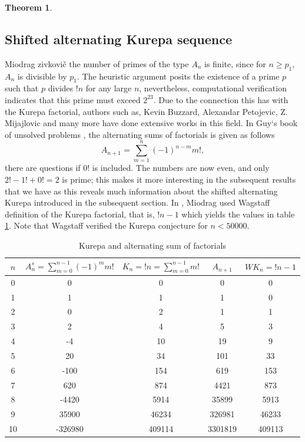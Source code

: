 \documentclass[pdflatex,sn-mathphys-num]{sn-jnl}%
\newtheorem{theorem}{Theorem}
\theoremstyle{thmstyleone}%
\theoremstyle{thmstyletwo}%
\theoremstyle{thmstylethree}%
\begin{document}
\begin{theorem}
\end{theorem}





\subsection{Shifted alternating Kurepa sequence}
Miodrag zivkovič \cite{zivkovic1999number} the number of primes of the type $A_n$ is finite, since for $n\geq p_1$,  $A_n$ is divisible by $p_1$. The heuristic argument posits the existence of a prime $p$ such that $p$ divides $!n$ for any large $n$, nevertheless, computational verification indicates that this prime must exceed $2^{23}$. Due to the connection this has with the Kurepa factorial, authors such as, Kevin Buzzard, Alexandar Petojevic, Z. Mijajlovic and many more \cite{mijajlovic1990some, mijajlovic2021fifty, petojevic2023new, andrejic2016searching, sun2011curious} have done extensive works in this field.
In Guy`s book of unsolved problems \cite{guy2004unsolved}, the alternating sums of factorials is given as follows
$$A_{n+1}=\sum_{m=1}^{n}(-1)^{n-m} m!,$$
there are questions if $0!$ is included. The numbers are now even, and only $2! - 1! + 0! = 2$ is prime; this makes it more interesting in the subsequent results that we have as this reveals much information about the shifted alternating Kurepa introduced in the subsequent section.
In \cite{zivkovic1999number}, Miodrag used Wagstaff definition of the Kurepa factorial, that is, $!n -1$ which yields the values in table \ref{mykure}.
Note that Wagstaff \cite{zivkovic1999number, mudge1996introducing, ashbacher1997some, cira2016various} verified the Kurepa conjecture for $n<50000.$

\begin{table}[!ht]\label{M Kure}
\centering
\begin{tabular}{|c|c|c|c|c|}\hline
$n$ & $A_n^s = \sum_{m=0}^{n-1} (-1)^m m!$ & $K_n =!n= \sum_{m=0}^{n-1} m!$ & $A_{n+1}$& $WK_n=!n-1$\\
\hline
0 & 0 & 0 & 0& 0\\
1 & 1 & 1 & 1 & 0\\ \rowcolor{LightCyan}
2 & 0 & 2 & 1 & 1\\ 
3 & 2 & 4 & 5 & 3\\
4 & -4 & 10 & 19& 9\\
5 & 20 & 34 & 101& 33\\
6 & -100 & 154& 619& 153 \\
7 & 620 & 874& 4421&873 \\
8 & -4420 & 5914 &35899& 5913 \\
9 & 35900 & 46234& 326981& 46233 \\
10 & -326980 & 409114& 3301819& 409113 \\
\hline
\end{tabular}
  \caption{Kurepa and  alternating sum of factorials}
    \label{mykure}
\end{table}
\end{document}
